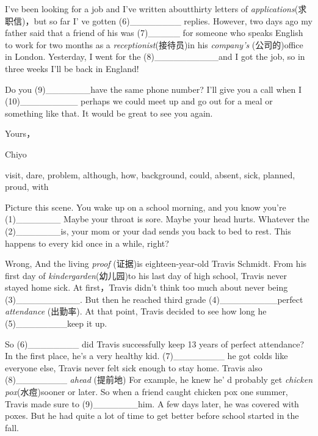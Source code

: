 \documentclass{ctexart}
\begin{document}
I've been looking for a job and I've written aboutthirty letters of 
\textit{applications}(求职信)，but so far I' ve gotten (6){\_}{\_}{\_}{\_}{\_}{\_}{\_}{\_} 
replies. However, two days ago my father said that a friend of his was 
(7){\_}{\_}{\_}{\_}{\_} for someone who speaks English to work for two 
months as a \textit{receptionist}(接待员)in his \textit{company's} (公司的)office in London. Yesterday, I went for 
the (8){\_}{\_}{\_}{\_}{\_}{\_}{\_}{\_}{\_}{\_}and I got the job, so in 
three weeks I'll be back in England!

Do you (9){\_}{\_}{\_}{\_}{\_}{\_}{\_}have the same phone number? I'll give 
you a call when I (10){\_}{\_}{\_}{\_}{\_}{\_}{\_}{\_}{\_} perhaps we could 
meet up and go out for a meal or something like that. It would be great to 
see you again.

\begin{flushright}
Yours，
\end{flushright}

\begin{flushright}
Chiyo
\end{flushright}

\begin{center}
visit, dare, problem, although, how, background, could, absent, sick, 
planned, proud, with 
\end{center}

Picture this scene. You wake up on a school morning, and you know you're 
(1){\_}{\_}{\_}{\_}{\_}{\_}{\_} Maybe your throat is sore. Maybe your head 
hurts. Whatever the (2){\_}{\_}{\_}{\_}{\_}{\_}{\_}is, your mom or your dad 
sends you back to bed to rest. This happens to every kid once in a while, 
right?

Wrong, And the living \textit{proof} (证据)is eighteen-year-old Travis Schmidt. From his 
first day of \textit{kindergarden}(幼儿园)to his last day of high school, Travis never stayed 
home sick. At first，Travis didn't think too much about never being 
(3){\_}{\_}{\_}{\_}{\_}{\_}{\_}{\_}{\_}{\_}. But then he reached third grade 
(4){\_}{\_}{\_}{\_}{\_}{\_}{\_}{\_}{\_}perfect \textit{attendance }(出勤率). At that point, 
Travis decided to see how long he (5){\_}{\_}{\_}{\_}{\_}{\_}{\_}{\_}keep it 
up.

So (6){\_}{\_}{\_}{\_}{\_}{\_}{\_}{\_} did Travis successfully keep 13 years 
of perfect attendance? In the first place, he's a very healthy kid. 
(7){\_}{\_}{\_}{\_}{\_}{\_}{\_}{\_} he got colds like everyone else, Travis 
never felt sick enough to stay home. Travis also 
(8){\_}{\_}{\_}{\_}{\_}{\_}{\_}{\_} \textit{ahead} (提前地) For example, he knew he' d 
probably get \textit{chicken pox}(水痘)sooner or later. So when a friend caught chicken pox one 
summer, Travis made sure to (9){\_}{\_}{\_}{\_}{\_}{\_}{\_}him. A few days 
later, he was covered with poxes. But he had quite a lot of time to get 
better before school started in the fall.
\end{document}
